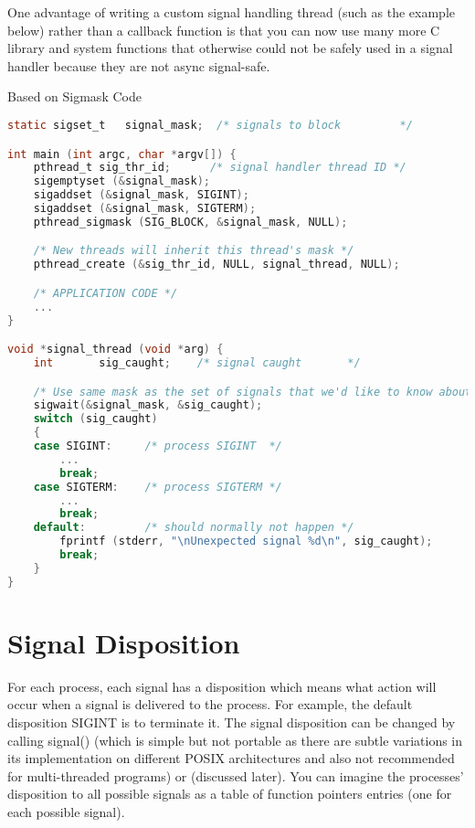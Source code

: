One advantage of writing a custom signal handling thread (such as the example below) rather than a callback function is that you can now use many more C library and system functions that otherwise could not be safely used in a signal handler because they are not async signal-safe.

Based on Sigmask Code\cite{pthread_sigmask}

\begin{lstlisting}[language=C]
static sigset_t   signal_mask;  /* signals to block         */

int main (int argc, char *argv[]) {
    pthread_t sig_thr_id;      /* signal handler thread ID */
    sigemptyset (&signal_mask);
    sigaddset (&signal_mask, SIGINT);
    sigaddset (&signal_mask, SIGTERM);
    pthread_sigmask (SIG_BLOCK, &signal_mask, NULL);

    /* New threads will inherit this thread's mask */
    pthread_create (&sig_thr_id, NULL, signal_thread, NULL);

    /* APPLICATION CODE */
    ...
}

void *signal_thread (void *arg) {
    int       sig_caught;    /* signal caught       */

    /* Use same mask as the set of signals that we'd like to know about! */
    sigwait(&signal_mask, &sig_caught);
    switch (sig_caught)
    {
    case SIGINT:     /* process SIGINT  */
        ...
        break;
    case SIGTERM:    /* process SIGTERM */
        ...
        break;
    default:         /* should normally not happen */
        fprintf (stderr, "\nUnexpected signal %d\n", sig_caught);
        break;
    }
}
\end{lstlisting}

\section{Signal Disposition}

For each process, each signal has a disposition which means what action will occur when a signal is delivered to the process. For example, the default disposition SIGINT is to terminate it. The signal disposition can be changed by calling signal() (which is simple but not portable as there are subtle variations in its implementation on different POSIX architectures and also not recommended for multi-threaded programs) or  (discussed later). You can imagine the processes' disposition to all possible signals as a table of function pointers entries (one for each possible signal).

